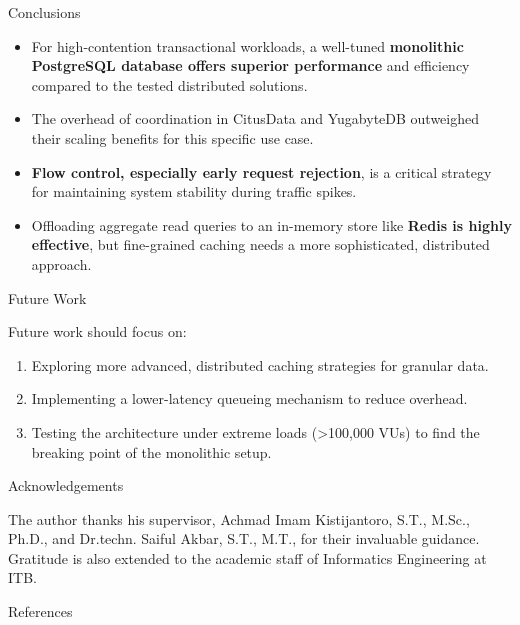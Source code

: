 \documentclass[a0,landscape]{config/poster/a0poster}
\newcommand{\postersection}[1]{%
  \begin{tcolorbox}[
    colback=IEEEblue,
    colframe=IEEEblue,
    fonttitle=\bfseries,
    coltext=white,
    sharp corners,
    boxrule=0pt,
    top=4pt,
    bottom=4pt,
    halign=center
  ]
    \large #1
  \end{tcolorbox}%
}
\begin{document}
\begin{multicols}{4}

    \columnbreak

    \postersection{Conclusions}
    \begin{itemize}
        \item For high-contention transactional workloads, a well-tuned \textbf{monolithic PostgreSQL database offers superior performance} and efficiency compared to the tested distributed solutions.
        \item The overhead of coordination in CitusData and YugabyteDB outweighed their scaling benefits for this specific use case.
        \item \textbf{Flow control, especially early request rejection}, is a critical strategy for maintaining system stability during traffic spikes.
        \item Offloading aggregate read queries to an in-memory store like \textbf{Redis is highly effective}, but fine-grained caching needs a more sophisticated, distributed approach.
    \end{itemize}


    \postersection{Future Work}
    Future work should focus on:
    \begin{enumerate}
        \item Exploring more advanced, distributed caching strategies for granular data.
        \item Implementing a lower-latency queueing mechanism to reduce overhead.
        \item Testing the architecture under extreme loads (\textgreater100,000 VUs) to find the breaking point of the monolithic setup.
    \end{enumerate}

    \postersection{Acknowledgements}
    The author thanks his supervisor, Achmad Imam Kistijantoro, S.T., M.Sc., Ph.D., and Dr.techn. Saiful Akbar, S.T., M.T., for their invaluable guidance. Gratitude is also extended to the academic staff of Informatics Engineering at ITB.


    \postersection{References}
    \printbibliography[heading=none]

\end{multicols}
\end{document}
